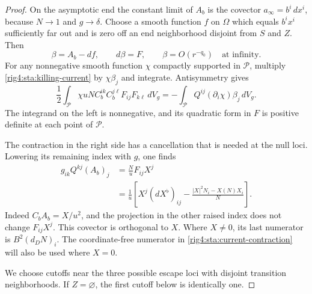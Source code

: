 \begin{proof}
On the asymptotic end the constant limit of $A_b$ is the covector
$a_\infty=b^i\,dx^i$, because $N\to1$ and $g\to\delta$.
Choose a smooth function $f$ on $\Omega$ which equals $b^i x^i$
sufficiently far out and is zero off an end neighborhood disjoint
from $S$ and $Z$. Then
\[
 \beta=A_b-df,\qquad d\beta=F,
 \qquad \beta=O(r^{-q_0})\quad\text{at infinity}.
\]
For any nonnegative smooth function $\chi$ compactly supported in
$\mathcal P$, multiply \eqref{rig4:sta:killing-current} by $\chi\beta_j$
and integrate. Antisymmetry gives
\begin{equation}\label{rig4:sta:twist-test}
 \frac12\int_{\mathcal P}
   \chi uN C_b^{ik}C_b^{j\ell}F_{ij}F_{k\ell}\,dV_g
  =-\int_{\mathcal P}Q^{ij}(\partial_i\chi)\beta_j\,dV_g.
\end{equation}
The integrand on the left is nonnegative, and its quadratic form in
$F$ is positive definite at each point of $\mathcal P$.

The contraction in the right side has a cancellation that is needed
at the null loci. Lowering its remaining index with $g$, one finds
\begin{equation}\label{rig4:sta:current-contraction}
 \begin{split}
 g_{ik}Q^{kj}(A_b)_j
 &=\frac N u F_{ij}X^j\\
 &=\frac1u\left[
 X^j(dX^\flat)_{ij}
 -\frac{|X|^2N_i-X(N)X_i}{N}\right].
 \end{split}
\end{equation}
Indeed $C_b A_b=X/u^2$, and the projection in the other raised index
does not change $F_{ij}X^j$. This covector is orthogonal to $X$.
Where $X\ne0$, its last numerator is $B^2(d_DN)_i$.
The coordinate-free numerator in \eqref{rig4:sta:current-contraction}
will also be used where $X=0$.

We choose cutoffs near the three possible escape loci with disjoint
transition neighborhoods. If $Z=\varnothing$, the first cutoff below
is identically one.


\end{proof}
